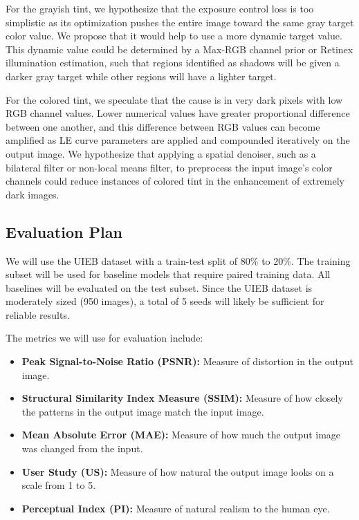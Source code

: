 \documentclass[11pt, letterpaper]{article}
\begin{document}
For the grayish tint, we hypothesize that the exposure control loss is too simplistic as its optimization pushes the entire image toward the same gray target color value. We propose that it would help to use a more dynamic target value. This dynamic value could be determined by a Max-RGB channel prior or Retinex illumination estimation, such that regions identified as shadows will be given a darker gray target while other regions will have a lighter target.

For the colored tint, we speculate that the cause is in very dark pixels with low RGB channel values. Lower numerical values have greater proportional difference between one another, and this difference between RGB values can become amplified as LE curve parameters are applied and compounded iteratively on the output image. We hypothesize that applying a spatial denoiser, such as a bilateral filter or non-local means filter, to preprocess the input image's color channels could reduce instances of colored tint in the enhancement of extremely dark images.

\subsection{Evaluation Plan}

We will use the UIEB dataset with a train-test split of 80\% to 20\%. The training subset will be used for baseline models that require paired training data. All baselines will be evaluated on the test subset. Since the UIEB dataset is moderately sized (950 images), a total of 5 seeds will likely be sufficient for reliable results.

The metrics we will use for evaluation include:
\begin{itemize}[noitemsep]
  \item \textbf{Peak Signal-to-Noise Ratio (PSNR):} Measure of distortion in the output image.
  \item \textbf{Structural Similarity Index Measure (SSIM):} Measure of how closely the patterns in the output image match the input image.
  \item \textbf{Mean Absolute Error (MAE):} Measure of how much the output image was changed from the input.
  \item \textbf{User Study (US):} Measure of how natural the output image looks on a scale from 1 to 5.
  \item \textbf{Perceptual Index (PI):} Measure of natural realism to the human eye.
\end{itemize}
\end{document}
